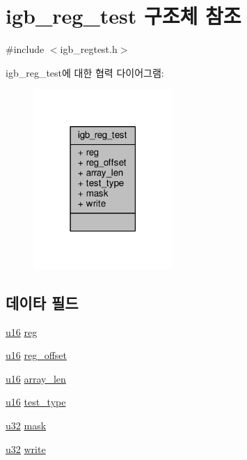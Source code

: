 \hypertarget{structigb__reg__test}{}\section{igb\+\_\+reg\+\_\+test 구조체 참조}
\label{structigb__reg__test}


{\ttfamily \#include $<$igb\+\_\+regtest.\+h$>$}



igb\+\_\+reg\+\_\+test에 대한 협력 다이어그램\+:
\nopagebreak
\begin{figure}[H]
\begin{center}
\leavevmode
\includegraphics[width=150pt]{structigb__reg__test__coll__graph}
\end{center}
\end{figure}
\subsection*{데이타 필드}
\begin{DoxyCompactItemize}
\item 
\hyperlink{lib_2igb_2e1000__osdep_8h_acdc9cf0314be0ae5a01d6d4379a95edd}{u16} \hyperlink{structigb__reg__test_a5dcc6445993ff921dac93f4f605bc0c3}{reg}
\item 
\hyperlink{lib_2igb_2e1000__osdep_8h_acdc9cf0314be0ae5a01d6d4379a95edd}{u16} \hyperlink{structigb__reg__test_a05b8f7352796e6752e9136077c31dd96}{reg\+\_\+offset}
\item 
\hyperlink{lib_2igb_2e1000__osdep_8h_acdc9cf0314be0ae5a01d6d4379a95edd}{u16} \hyperlink{structigb__reg__test_a00736fbf0b697ba670b22ae5c15c2c0b}{array\+\_\+len}
\item 
\hyperlink{lib_2igb_2e1000__osdep_8h_acdc9cf0314be0ae5a01d6d4379a95edd}{u16} \hyperlink{structigb__reg__test_a803e2ff6da1ec42a5c83aab18644fbff}{test\+\_\+type}
\item 
\hyperlink{lib_2igb_2e1000__osdep_8h_a64e91c10a0d8fb627e92932050284264}{u32} \hyperlink{structigb__reg__test_abef421db8c3f55f9fa7c05727c4ab3e4}{mask}
\item 
\hyperlink{lib_2igb_2e1000__osdep_8h_a64e91c10a0d8fb627e92932050284264}{u32} \hyperlink{structigb__reg__test_a03c506d38835bd26a79d9a0d012c4d8b}{write}
\end{DoxyCompactItemize}


